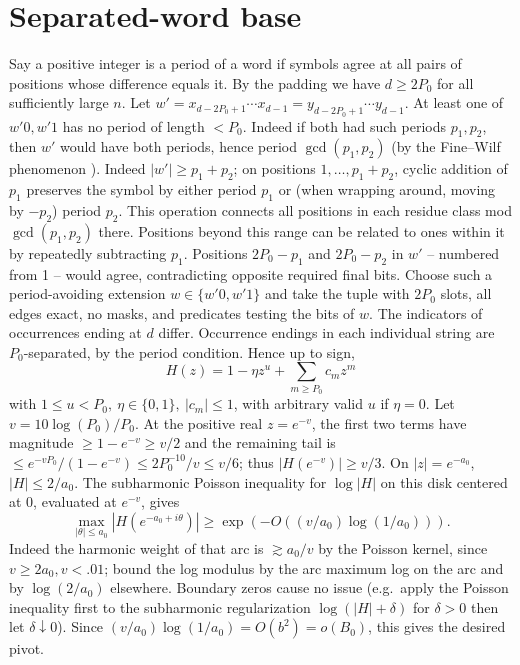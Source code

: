 \documentclass[11pt]{article}
\begin{document}
\section*{Separated-word base} Say a positive integer is a period of a word if symbols agree at all pairs of positions whose difference equals it. By the padding we have \(d\ge 2P_0\) for all sufficiently large \(n\). Let \(w'=x_{d-2P_0+1}\cdots x_{d-1}=y_{d-2P_0+1}\cdots y_{d-1}\). At least one of \(w'0,w'1\) has no period of length \(<P_0\). Indeed if both had such periods \(p_1,p_2\), then \(w'\) would have both periods, hence period \(\gcd(p_1,p_2)\) (by the Fine--Wilf phenomenon \cite{FW}). Indeed \(|w'|\ge p_1+p_2\); on positions \(1,\ldots,p_1+p_2\), cyclic addition of \(p_1\) preserves the symbol by either period \(p_1\) or (when wrapping around, moving by \(-p_2\)) period \(p_2\). This operation connects all positions in each residue class mod \(\gcd(p_1,p_2)\) there. Positions beyond this range can be related to ones within it by repeatedly subtracting \(p_1\). Positions \(2P_0-p_1\) and \(2P_0-p_2\) in \(w'\) -- numbered from 1 -- would agree, contradicting opposite required final bits. Choose such a period-avoiding extension \(w\in\{w'0,w'1\}\) and take the tuple with \(2P_0\) slots, all edges exact, no masks, and predicates testing the bits of \(w\). The indicators of occurrences ending at \(d\) differ. Occurrence endings in each individual string are \(P_0\)-separated, by the period condition. Hence up to sign,
\[
 H(z)=1-\eta z^u +\sum_{m\ge P_0} c_m z^m
\]
with \(1\le u<P_0,\ \eta\in\{0,1\},\ |c_m|\le1\), with arbitrary valid \(u\) if \(\eta=0\). Let \(v=10\log(P_0)/P_0\). At the positive real \(z=e^{-v}\), the first two terms have magnitude \(\ge1-e^{-v}\ge v/2\) and the remaining tail is \(\le e^{-vP_0}/(1-e^{-v})\le 2P_0^{-10}/v\le v/6\); thus \(|H(e^{-v})|\ge v/3\). On \(|z|=e^{-a_0}\), \(|H|\le 2/a_0\). The subharmonic Poisson inequality for \(\log|H|\) on this disk centered at 0, evaluated at \(e^{-v}\), gives
\[
 \max_{|\theta|\le a_0}|H(e^{-a_0+i\theta})|\ge
 \exp(-O((v/a_0)\log(1/a_0))) .
\]
Indeed the harmonic weight of that arc is \(\gtrsim a_0/v\) by the Poisson kernel, since \(v\ge 2a_0, v<.01\); bound the log modulus by the arc maximum log on the arc and by \(\log(2/a_0)\) elsewhere. Boundary zeros cause no issue (e.g.\ apply the Poisson inequality first to the subharmonic regularization \(\log(|H|+\delta)\) for \(\delta>0\) then let \(\delta\downarrow0\)). Since \((v/a_0)\log(1/a_0)=O(b^2)=o(B_0)\), this gives the desired pivot.
\end{document}
